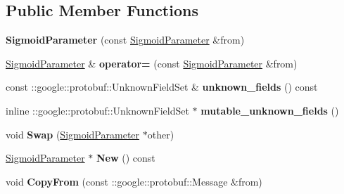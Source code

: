 \subsection*{Public Member Functions}
\begin{DoxyCompactItemize}
\item 
\mbox{\label{classcaffe_1_1_sigmoid_parameter_af89f84687c02c29e0fef17f4d78ea37e}} 
{\bfseries Sigmoid\+Parameter} (const \mbox{\hyperlink{classcaffe_1_1_sigmoid_parameter}{Sigmoid\+Parameter}} \&from)
\item 
\mbox{\label{classcaffe_1_1_sigmoid_parameter_ac819b7f4f559ad9ecad92d5bd06bb740}} 
\mbox{\hyperlink{classcaffe_1_1_sigmoid_parameter}{Sigmoid\+Parameter}} \& {\bfseries operator=} (const \mbox{\hyperlink{classcaffe_1_1_sigmoid_parameter}{Sigmoid\+Parameter}} \&from)
\item 
\mbox{\label{classcaffe_1_1_sigmoid_parameter_a78f7e6e93d9d060f0f364381f42397a0}} 
const \+::google\+::protobuf\+::\+Unknown\+Field\+Set \& {\bfseries unknown\+\_\+fields} () const
\item 
\mbox{\label{classcaffe_1_1_sigmoid_parameter_a8ef33f71cbfba0be0d4553b175af05ba}} 
inline \+::google\+::protobuf\+::\+Unknown\+Field\+Set $\ast$ {\bfseries mutable\+\_\+unknown\+\_\+fields} ()
\item 
\mbox{\label{classcaffe_1_1_sigmoid_parameter_af826ea89c392763d2693c914cead44c5}} 
void {\bfseries Swap} (\mbox{\hyperlink{classcaffe_1_1_sigmoid_parameter}{Sigmoid\+Parameter}} $\ast$other)
\item 
\mbox{\label{classcaffe_1_1_sigmoid_parameter_a669493d081a265cc72b27b92be63c34f}} 
\mbox{\hyperlink{classcaffe_1_1_sigmoid_parameter}{Sigmoid\+Parameter}} $\ast$ {\bfseries New} () const
\item 
\mbox{\label{classcaffe_1_1_sigmoid_parameter_afe7eeb728d2d4ba3e101409d0467808b}} 
void {\bfseries Copy\+From} (const \+::google\+::protobuf\+::\+Message \&from)
\item 
\mbox{\label{classcaffe_1_1_sigmoid_parameter_a03aa7e9d0ea2a9b6bf33d1ba875fed04}} 

\end{DoxyCompactItemize}
